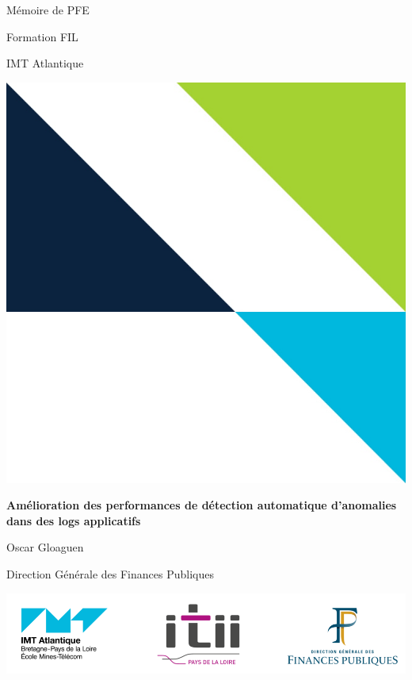 \documentclass[openany, 11pt]{memoir}
\begin{document}
\frontmatter
{}

\begin{minipage}{0.5\textwidth}
	\Large
	Mémoire de PFE
	
	\vspace{10pt}
	Formation FIL
	
	\vspace{10pt}
	IMT Atlantique
\end{minipage}
\begin{minipage}{0.45\textwidth} %
	\includegraphics[width=\textwidth]{images/header.png}
\end{minipage}

\begin{minipage}{\textwidth}
    \centering \LARGE
    \vspace{20pt}
    \textbf{Amélioration des performances de détection automatique d'anomalies dans des logs applicatifs}
	
    \vspace{5pt}
	Oscar Gloaguen
	
	\vspace{60pt}
    Direction Générale des Finances Publiques
\end{minipage}

\vfill
\includegraphics[width=\textwidth]{images/logos.png}
\end{document}
